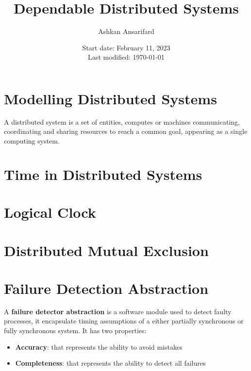 \documentclass{article}
\title{Dependable Distributed Systems}
\author{Ashkan Ansarifard}
\date{Start date: February 11, 2023 \\ Last modified: \today}
\begin{document}
	
\maketitle
\newpage
\tableofcontents
	
\newpage
\newpage
\section{Modelling Distributed Systems}
A distributed system is a set of entities, computes or machines communicating, coordinating and sharing resources to reach a common goal, appearing as a single computing system.

\newpage
\section{Time in Distributed Systems}

\newpage
\section{Logical Clock}

\newpage
\section{Distributed Mutual Exclusion}

\newpage
\section{Failure Detection Abstraction}
A \textbf{failure detector abstraction} is a software module used to detect faulty processes, it encapsulate timing assumptions of a either partially synchronous or fully synchronous system. It has two properties:
\begin{itemize}
	\item \textbf{Accuracy}: that represents the ability to avoid mistakes
	\item \textbf{Completeness}: that represents the ability to detect all failures
\end{itemize}
\end{document}
